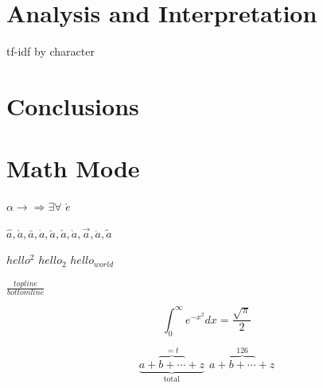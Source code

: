 \documentclass{article}
\begin{document}
\section{Analysis and Interpretation}

\begin{table}
\caption{tf-idf by character}
\label{tab:tfidf}

\end{table}

\section{Conclusions}




\section{Math Mode}

$ \alpha \rightarrow \Rightarrow \exists \forall $
$ \acute{e} $

$ \hat{a} , \acute{a} , \bar{a} , \dot{a} , \breve{a} ,
\check{a} , \grave{a} , \vec{a} , \ddot{a} , \tilde{a} $

$hello^2$ $hello_2$ $hello_{world}$ 

$\frac{topline}{bottomline}$

\begin{equation}
\int_0^\infty e^{-x^2} dx=\frac{\sqrt{\pi}}{2}
\end{equation}

\begin{equation}
\underbrace{a+\overbrace{b+\cdots}^{{}=t}+z}
_{\mathrm{total}} ~~
a+{\overbrace{b+\cdots}}^{126}+z
\label{eq:TooComplex}
\end{equation}
\end{document}
